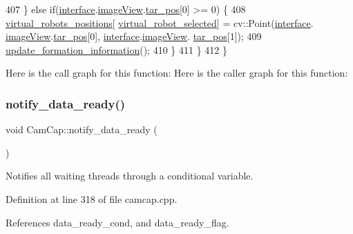 \begin{DoxyCode}
407         \} \textcolor{keywordflow}{else} \textcolor{keywordflow}{if}(\hyperlink{class_cam_cap_a58002893dfb61307042ddbba0c362dcd}{interface}.\hyperlink{class_v_s_s_s___g_u_i_1_1_v4_l_interface_a2c99f4d9fad8a34fa98d5b61beb06745}{imageView}.\hyperlink{class_image_view_a569238a3b9d094c11637673dba40bf29}{tar\_pos}[0] >= 0) \{
408             \hyperlink{class_cam_cap_afdbec56c1e17c308441cf2eaad035e45}{virtual\_robots\_positions}[
      \hyperlink{class_cam_cap_a6709fb57a514b9aa6ee943b2b57fdbe7}{virtual\_robot\_selected}] = cv::Point(\hyperlink{class_cam_cap_a58002893dfb61307042ddbba0c362dcd}{interface}.
      \hyperlink{class_v_s_s_s___g_u_i_1_1_v4_l_interface_a2c99f4d9fad8a34fa98d5b61beb06745}{imageView}.\hyperlink{class_image_view_a569238a3b9d094c11637673dba40bf29}{tar\_pos}[0], \hyperlink{class_cam_cap_a58002893dfb61307042ddbba0c362dcd}{interface}.\hyperlink{class_v_s_s_s___g_u_i_1_1_v4_l_interface_a2c99f4d9fad8a34fa98d5b61beb06745}{imageView}.
      \hyperlink{class_image_view_a569238a3b9d094c11637673dba40bf29}{tar\_pos}[1]);
409             \hyperlink{class_cam_cap_afa26f0cbaee5db899735934f3548ebe9}{update\_formation\_information}();
410         \}
411     \}
412 \}
\end{DoxyCode}
Here is the call graph for this function\+:
Here is the caller graph for this function\+:
\mbox{\label{class_cam_cap_ad34d9213700050e66a66e63d027b9bf0}} 
\subsubsection{\texorpdfstring{notify\+\_\+data\+\_\+ready()}{notify\_data\_ready()}}
{\footnotesize\ttfamily void Cam\+Cap\+::notify\+\_\+data\+\_\+ready (\begin{DoxyParamCaption}{ }\end{DoxyParamCaption})}



Notifies all waiting threads through a conditional variable. 



Definition at line 318 of file camcap.\+cpp.



References data\+\_\+ready\+\_\+cond, and data\+\_\+ready\+\_\+flag.



